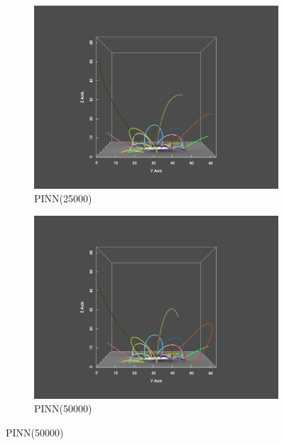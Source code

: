 \begin{figure}
  \begin{subfigure}{.5\linewidth}
    \centering
    \caption{PINN(25000)}
    \includegraphics[trim={6cm 1cm 6cm 2cm}, clip, width=\linewidth]{"img/PINN_025000_yz.pdf"}
  \end{subfigure}%
  \begin{subfigure}{.5\linewidth}
    \centering
    \caption{PINN(50000)}
    \includegraphics[trim={6cm 1cm 6cm 2cm}, clip, width=\linewidth]{"img/PINN_050000_yz.pdf"}
  \end{subfigure}
  

\end{figure}
